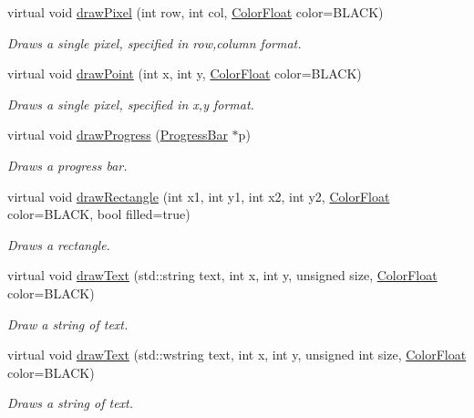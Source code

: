 \begin{DoxyCompactItemize}
virtual void \hyperlink{classtsgl_1_1_canvas_af17d456eca4ad5a55842f2cf02f48a97}{draw\-Pixel} (int row, int col, \hyperlink{structtsgl_1_1_color_float}{\-Color\-Float} color=\-B\-L\-A\-C\-K)
\begin{DoxyCompactList}\small\item\em \-Draws a single pixel, specified in row,column format. \end{DoxyCompactList}\item 
virtual void \hyperlink{classtsgl_1_1_canvas_a6c17c90cd13f7b0184a25e4acc2b7426}{draw\-Point} (int x, int y, \hyperlink{structtsgl_1_1_color_float}{\-Color\-Float} color=\-B\-L\-A\-C\-K)
\begin{DoxyCompactList}\small\item\em \-Draws a single pixel, specified in x,y format. \end{DoxyCompactList}\item 
virtual void \hyperlink{classtsgl_1_1_canvas_aea792059486ebe6d25d7f81bdadf751d}{draw\-Progress} (\hyperlink{classtsgl_1_1_progress_bar}{\-Progress\-Bar} $\ast$p)
\begin{DoxyCompactList}\small\item\em \-Draws a progress bar. \end{DoxyCompactList}\item 
virtual void \hyperlink{classtsgl_1_1_canvas_a752754cd16d14447cb5e5b0438bebf16}{draw\-Rectangle} (int x1, int y1, int x2, int y2, \hyperlink{structtsgl_1_1_color_float}{\-Color\-Float} color=\-B\-L\-A\-C\-K, bool filled=true)
\begin{DoxyCompactList}\small\item\em \-Draws a rectangle. \end{DoxyCompactList}\item 
virtual void \hyperlink{classtsgl_1_1_canvas_a3457e7ebd17fa5003025ff6bcaaeedf6}{draw\-Text} (std\-::string text, int x, int y, unsigned size, \hyperlink{structtsgl_1_1_color_float}{\-Color\-Float} color=\-B\-L\-A\-C\-K)
\begin{DoxyCompactList}\small\item\em \-Draw a string of text. \end{DoxyCompactList}\item 
virtual void \hyperlink{classtsgl_1_1_canvas_a0687604ebe60b37e8685671252172996}{draw\-Text} (std\-::wstring text, int x, int y, unsigned int size, \hyperlink{structtsgl_1_1_color_float}{\-Color\-Float} color=\-B\-L\-A\-C\-K)
\begin{DoxyCompactList}\small\item\em \-Draws a string of text. \end{DoxyCompactList}\item 

\end{DoxyCompactItemize}
